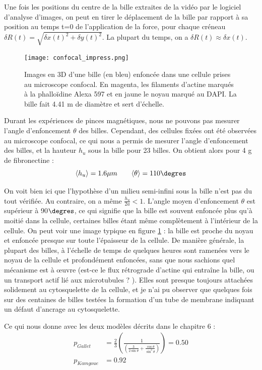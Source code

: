 Une fois les positions du centre de la bille extraites de la vidéo par le logiciel d'analyse d'images, on peut en tirer le déplacement de la bille par rapport à sa position au temps t=0 de l'application de la force, pour chaque créneau $\delta R(t)=\sqrt{\delta x(t)^2+\delta y(t)^2}$. 
La plupart du temps, on a $\delta R(t) \approx \delta x(t)$. 

\begin{figure}
\texttt{[image: confocal\_impress.png]}
\caption{\label{confocal} Images en 3D d'une bille (en bleu) enfoncée dans une cellule prises au microscope confocal. En magenta, les filaments d'actine marqués à la phalloïdine Alexa 597 et en jaune le noyau marqué au DAPI. La bille fait 4.41 \micro m de diamètre et sert d'échelle.}
\end{figure}
Durant les expériences de pinces magnétiques, nous ne pouvons pas mesurer l'angle d'enfoncement $\theta$ des billes. Cependant, des cellules fixées ont été observées au microscope confocal, ce qui nous a permis de mesurer l'angle d'enfoncement des billes, et la hauteur $h_u$ sous la bille pour 23 billes. On obtient alors pour 4 \micro g de fibronectine : 
$$ \langle h_u \rangle = 1.6 \mu m \qquad \langle \theta \rangle = 110 \degres$$

On voit bien ici que l'hypothèse d'un milieu semi-infini sous la bille n'est pas du tout vérifiée. Au contraire, on a même $\frac{h_u}{2a} <1$. L'angle moyen d'enfoncement $\theta$ est supérieur à 90$\degres$, ce qui signifie que la bille est souvent enfoncée plus qu'à moitié dans la cellule, certaines billes étant même complètement à l'intérieur de la cellule. On peut voir une image typique en figure \ref{confocal} : la bille est proche du noyau et enfoncée presque sur toute l'épaisseur de la cellule. 
De manière générale, la plupart des billes, à l'échelle de temps de quelques heures sont ramenées vers le noyau de la cellule et profondément enfoncées, sans que nous sachions quel mécanisme est à \oe uvre (est-ce le flux rétrograde d'actine qui entraîne la bille, ou un transport actif lié aux microtubules ? ). Elles sont presque toujours attachées solidement au cytosquelette de la cellule, et je n'ai pu observer que quelques fois sur des centaines de billes testées la formation d'un tube de membrane indiquant un défaut d'ancrage au cytosquelette. 

Ce qui nous donne avec les deux modèles décrits dans le chapitre 6 : 
\begin{align}
 p_{Gallet}&=\frac{2}{3}\left(\frac{1}{\left( \frac{3}{2 \sin \theta}+\frac{\cos \theta}{\sin^3 \theta}\right)} \right) = 0.50 \\
p_{Kamgoue}&= 0.92\\
\end{align}


